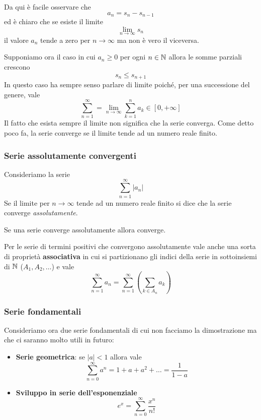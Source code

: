 \begin{observation}
	Da qui è facile osservare che
	\[ a_n = s_n - s_{n-1} \]
	ed è chiaro che se esiste il limite
	\[ \lim_{n \to \infty} s_n \]
	il valore $a_n$ tende a zero per $n \to \infty$ ma non è vero il viceversa.
\end{observation}

Supponiamo ora il caso in cui $a_n \geq 0$ per ogni $n \in \mathbb{N}$ allora le somme parziali crescono
\[ s_n \leq s_{n+1} \]
In questo caso ha sempre senso parlare di limite poiché, per una successione del genere, vale
\[ \sum_{n=1}^\infty = \lim_{n \to \infty} \sum_{k=1}^n a_k \in [0, +\infty]  \]
Il fatto che esista sempre il limite non significa che la serie converga. Come detto poco fa, la serie
converge se il limite tende ad un numero reale finito.

\subsubsection{Serie assolutamente convergenti}
\begin{definition}
	Consideriamo la serie
	\[ \sum_{n=1}^\infty |a_n| \]
	Se il limite per $n \to \infty$ tende ad un numero reale finito si dice che la serie converge
	\emph{assolutamente}.
\end{definition}

\begin{theorem}
	Se una serie converge assolutamente allora converge.
\end{theorem}

Per le serie di termini positivi che convergono assolutamente vale anche una sorta di proprietà
\textbf{associativa} in cui si partizionano gli indici della serie in sottoinsiemi di $\mathbb{N}$
($A_1, A_2, \dots$) e vale
\[ \sum_{n=1}^\infty a_n = \sum_{n=1}^\infty \left( \sum_{k \in A_n} a_k \right) \]

\subsubsection{Serie fondamentali}
Consideriamo ora due serie fondamentali di cui non facciamo la dimostrazione ma che ci saranno molto
utili in futuro:
\begin{itemize}
	\item \textbf{Serie geometrica}: se $|a| < 1$ allora vale
	      \[ \sum_{n=0}^\infty a^n = 1 + a + a^2 + \dots = \frac{1}{1 - a} \]
	\item \textbf{Sviluppo in serie dell'esponenziale}
	      \[ e^x = \sum_{n=0}^\infty \frac{x^n}{n!} \]
\end{itemize}
